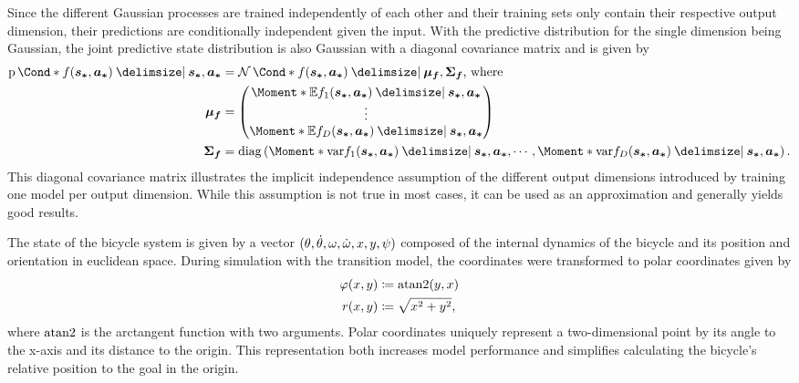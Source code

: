 Since the different Gaussian processes are trained independently of each other and their training sets only contain their respective output dimension, their predictions are conditionally independent given the input.
With the predictive distribution for the single dimension being Gaussian, the joint predictive state distribution is also Gaussian with a diagonal covariance matrix and is given by
\begin{align}
    \Prob*{f(\mat{s_\ast}, \mat{a_\ast}) \given \mat{s_\ast}, \mat{a_\ast}} &=
    \Gaussian*{f(\mat{s_\ast}, \mat{a_\ast}) \given \mat{\mu_f}, \mat{\Sigma_f}}\text{, where} \\
    \mat{\mu_f} &= \begin{pmatrix}
    \Moment*{\E}{f_1(\mat{s_\ast}, \mat{a_\ast}) \given \mat{s_\ast}, \mat{a_\ast}} \\
    \vdots \\
    \Moment*{\E}{f_D(\mat{s_\ast}, \mat{a_\ast}) \given \mat{s_\ast}, \mat{a_\ast}} \\
    \end{pmatrix} \\
    \mat{\Sigma_f} &= \diag\left(
        \Moment*{\var}{f_1(\mat{s_\ast}, \mat{a_\ast}) \given \mat{s_\ast}, \mat{a_\ast}},
        \cdots,
        \Moment*{\var}{f_D(\mat{s_\ast}, \mat{a_\ast}) \given \mat{s_\ast}, \mat{a_\ast}}
    \right).
\end{align}
This diagonal covariance matrix illustrates the implicit independence assumption of the different output dimensions introduced by training one model per output dimension.
While this assumption is not true in most cases, it can be used as an approximation and generally yields good results.

The state of the bicycle system is given by a vector $(\theta, \dot{\theta}, \omega, \dot{\omega}, x, y, \psi)$ composed of the internal dynamics of the bicycle and its position and orientation in euclidean space.
During simulation with the transition model, the coordinates were transformed to polar coordinates given by
\begin{align}
    \varphi(x, y) &\coloneqq \operatorname{atan2}(y, x) \\
    r(x, y) &\coloneqq \sqrt{x^2 + y^2},
\end{align}
where $\operatorname{atan2}$ is the arctangent function with two arguments.
Polar coordinates uniquely represent a two-dimensional point by its angle to the x-axis and its distance to the origin.
This representation both increases model performance and simplifies calculating the bicycle's relative position to the goal in the origin.

